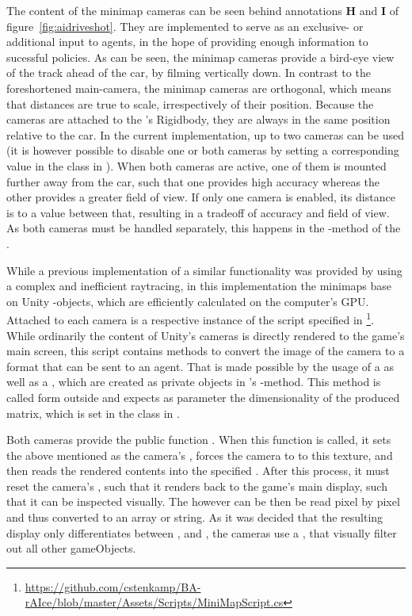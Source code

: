 The content of the minimap cameras can be seen behind annotations \textbf{H} and \textbf{I} of figure~\ref{fig:aidriveshot}. They are implemented to serve as an exclusive- or additional input to agents, in the hope of providing enough information to sucessful policies. As can be seen, the minimap cameras provide a bird-eye view of the track ahead of the car, by filming vertically down. In contrast to the foreshortened main-camera, the minimap cameras are orthogonal, which means that distances are true to scale, irrespectively of their position. Because the cameras are attached to the 's Rigidbody, they are always in the same position relative to the car. In the current implementation, up to two cameras can be used (it is however possible to disable one or both cameras by setting a corresponding value in the class  in ). When both cameras are active, one of them is mounted further away from the car, such that one provides high accuracy whereas the other provides a greater field of view. If only one camera is enabled, its distance is to a value between that, resulting in a tradeoff of accuracy and field of view. As both cameras must be handled separately, this happens in the -method of the .

While a previous implementation of a similar functionality was provided by \leon using a complex and inefficient raytracing, in this implementation the minimaps base on Unity -objects, which are efficiently calculated on the computer's GPU. Attached to each camera is a respective instance of the script specified in \footnote{\url{https://github.com/cstenkamp/BA-rAIce/blob/master/Assets/Scripts/MiniMapScript.cs}}. While ordinarily the content of Unity's cameras is directly rendered to the game's main screen, this script contains methods to convert the image of the camera to a format that can be sent to an agent. That is made possible by the usage of a  as well as a , which are created as private objects in 's -method. This method is called form outside and expects as parameter the dimensionality of the produced matrix, which is set in the class  in . 

Both cameras provide the public function . When this function is called, it sets the above mentioned  as the camera's , forces the camera to  to this texture, and then reads the rendered contents into the specified . After this process, it must reset the camera's , such that it renders back to the game's main display, such that it can be inspected visually. The  however can be then be read pixel by pixel and thus converted to an array or string. As it was decided that the resulting display only differentiates between ,  and , the cameras use a , that visually filter out all other gameObjects.

